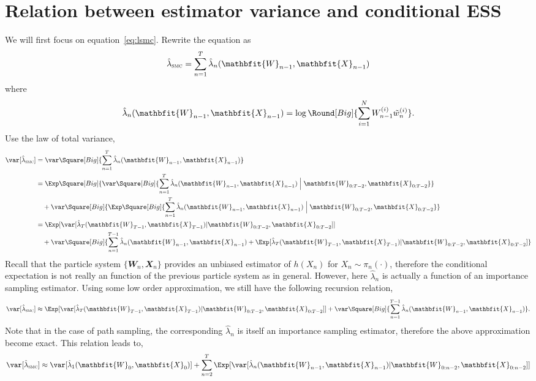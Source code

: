 \documentclass[11pt, fontset = Minion]{marticle}
\def\smc{\textsc{smc}\xspace}
\def\tw{\tilde{w}}
\def\W{\mathbfit{W}}
\def\X{\mathbfit{X}}
\def\lsmc{\hat\lambda_{\text{\smc}}}
\begin{document}
  \section{Relation between estimator variance and conditional ESS}

  We will first focus on equation~\eqref{eq:lsmc}. Rewrite the equation as
  \begin{equation}
    \lsmc = \sum_{n=1}^T\hat\lambda_n(\W_{n-1},\X_{n-1})
  \end{equation}
  where
  \begin{equation}
    \hat\lambda_n(\W_{n-1},\X_{n-1}) = \log\Round[Big]{
      \sum_{i=1}^NW_{n-1}^{(i)}\tw_{n}^{(i)}}.
  \end{equation}
  Use the law of total variance,
  \begin{align}
    \var[\lsmc]
    &= \var\Square[Big]{\sum_{n=1}^T\hat\lambda_n(\W_{n-1},\X_{n-1})} \notag\\
    &=
    \Exp\Square[Big]{\var\Square[Big]{
        \sum_{n=1}^T\hat\lambda_n(\W_{n-1},\X_{n-1})\Bigm|
        \W_{0:T-2},\X_{0:T-2}}}
    \notag\\&\quad+
    \var\Square[Big]{\Exp\Square[Big]{
        \sum_{n=1}^T\hat\lambda_n(\W_{n-1},\X_{n-1})\Bigm|
        \W_{0:T-2},\X_{0:T-2}}} \notag\\
    &= \Exp[\var[\hat\lambda_T(\W_{T-1},\X_{T-1})|\W_{0:T-2},\X_{0:T-2}]]
    \notag\\&\quad+
    \var\Square[Big]{
      \sum_{n=1}^{T-1}\hat\lambda_n(\W_{n-1},\X_{n-1}) +
      \Exp[\hat\lambda_T(\W_{T-1},\X_{T-1})|\W_{0:T-2},\X_{0:T-2}]}
  \end{align}
  Recall that the particle system $\{\W_n,\X_n\}$ provides an unbiased
  estimator of $h(X_n)$ for $X_n\sim\pi_n(\cdot)$, therefore the conditional
  expectation is not really an function of the previous particle system as in
  general. However, here $\hat\lambda_n$ is actually a function of an
  importance sampling estimator. Using some low order approximation, we still
  have the following recursion relation,
  \begin{equation}
    \var[\lsmc] \approx
    \Exp[\var[\hat\lambda_T(\W_{T-1},\X_{T-1})|\W_{0:T-2},\X_{0:T-2}]] +
    \var\Square[Big]{\sum_{n=1}^{T-1}\hat\lambda_n(\W_{n-1},\X_{n-1})}.
  \end{equation}
  Note that in the case of path sampling, the corresponding $\hat\lambda_n$ is
  itself an importance sampling estimator, therefore the above approximation
  become exact. This relation leads to,
  \begin{equation}
    \var[\lsmc] \approx \var[\hat\lambda_1(\W_0,\X_0)] +
    \sum_{n=2}^T
    \Exp[\var[\hat\lambda_n(\W_{n-1},\X_{n-1})|\W_{0:n-2},\X_{0:n-2}]]
  \end{equation}
\end{document}
